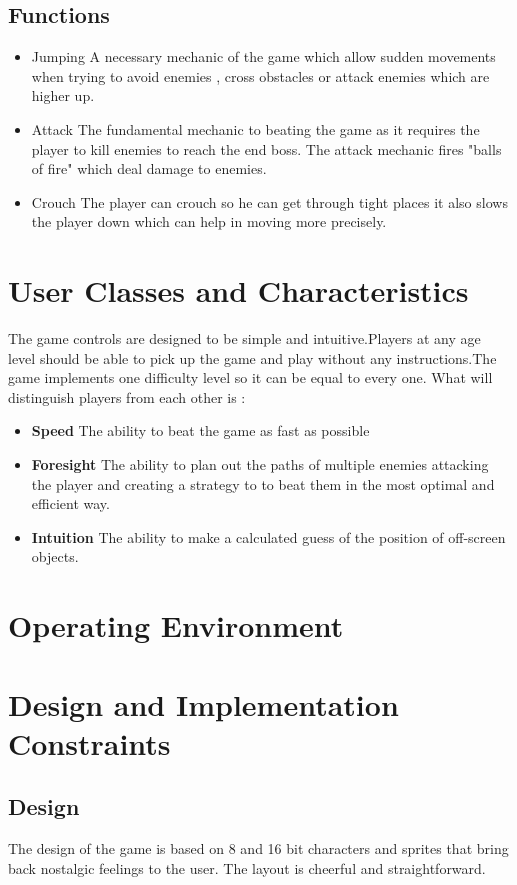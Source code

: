 \subsection{Functions}
\begin{itemize}
    \item Jumping
    A necessary mechanic of the game which allow sudden movements when trying to avoid enemies , cross obstacles or attack enemies which are higher up.
    \item Attack
    The fundamental mechanic to beating the game as it requires the player to kill enemies to reach the end boss. The attack mechanic fires "balls of fire" which deal damage to enemies.
    \item Crouch
    The player can crouch so he can get through tight places it also slows the player down which can help in moving more precisely.
\end{itemize}
\section{User Classes and Characteristics}
The game controls are designed to be simple and intuitive.Players at any age level should be able to pick up the game and play without any instructions.The game implements one difficulty level so it can be equal to every one. 
What will distinguish players from each other is : 
\begin{itemize}
    \item \textbf{Speed} The ability to beat the game as fast as possible
    \item \textbf{Foresight} The ability to plan out the paths of multiple enemies attacking the player and creating a strategy to to beat them in the most optimal and efficient way.
    \item \textbf{Intuition} The ability to make a calculated guess of the position of off-screen objects.
    
\end{itemize}
\section{Operating Environment}

\section{Design and Implementation Constraints}
\subsection {Design}
The design of the game is based on 8 and 16 bit characters and sprites that bring back nostalgic feelings to the user. The layout is cheerful and straightforward.
